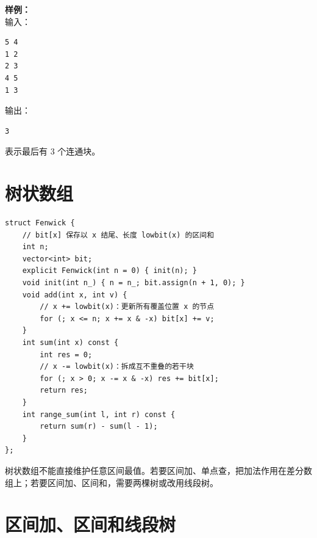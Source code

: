 \begin{card}
\textbf{样例：}\\
输入：
\begin{lstlisting}
5 4
1 2
2 3
4 5
1 3
\end{lstlisting}
输出：
\begin{lstlisting}
3
\end{lstlisting}
表示最后有 3 个连通块。
\end{card}

\section{树状数组}


\begin{lstlisting}[style=cpp]
struct Fenwick {
    // bit[x] 保存以 x 结尾、长度 lowbit(x) 的区间和
    int n;
    vector<int> bit;
    explicit Fenwick(int n = 0) { init(n); }
    void init(int n_) { n = n_; bit.assign(n + 1, 0); }
    void add(int x, int v) {
        // x += lowbit(x)：更新所有覆盖位置 x 的节点
        for (; x <= n; x += x & -x) bit[x] += v;
    }
    int sum(int x) const {
        int res = 0;
        // x -= lowbit(x)：拆成互不重叠的若干块
        for (; x > 0; x -= x & -x) res += bit[x];
        return res;
    }
    int range_sum(int l, int r) const {
        return sum(r) - sum(l - 1);
    }
};
\end{lstlisting}

\begin{warnbox}
树状数组不能直接维护任意区间最值。若要区间加、单点查，把加法作用在差分数组上；若要区间加、区间和，需要两棵树或改用线段树。
\end{warnbox}

\section{区间加、区间和线段树}


